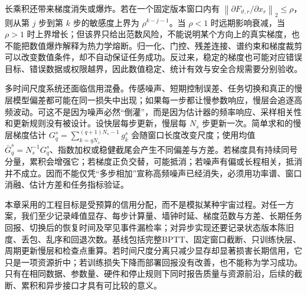 长乘积还带来梯度消失或爆炸。若在一个固定版本窗口内有 $\left\lVert \partial F_{\vartheta,r}/\partial x_r\right\rVert_2\leq\rho$，则从第 $j$ 步到第 $k$ 步的敏感度上界为 $\rho^{k-j-1}$。当 $\rho<1$ 时远期影响衰减，当 $\rho>1$ 时上界增长；但该界只给出范数风险，不能说明某个方向上的真实梯度，也不能把数值爆炸解释为热力学熔断。归一化、门控、残差连接、谱约束和梯度裁剪可以改变数值条件，却不自动保证任务成功。反过来，稳定的梯度也可能对应错误目标、错误数据或权限越界，因此数值稳定、统计有效与安全合规需要分别验收。

多时间尺度系统还面临信用混叠。传感噪声、短期控制误差、任务切换和真正的慢层模型偏差都可能在同一损失中出现；如果每一步都让慢参数响应，慢层会追逐高频波动。可这不是因为噪声必然“倒灌”，而是因为估计器的频率响应、采样相关性和更新规则没有被设计。设快层每步更新，慢层每 $N_s$ 步更新一次。简单求和的慢层梯度估计 $G_q^s=\sum_{k=qN_s}^{(q+1)N_s-1}g_k^s$ 会随窗口长度改变尺度；使用均值 $\bar G_q^s=N_s^{-1}G_q^s$、指数加权或稳健截尾会产生不同偏差与方差。若梯度具有持续同号分量，累积会增强它；若梯度正负交替，可能抵消；若噪声有偏或长程相关，抵消并不成立。因而不能仅凭“多步相加”宣称高频噪声已经消失，必须用功率谱、窗口消融、估计方差和任务指标验证。

本章采用的工程目标是受预算的信用分配，而不是模拟某种宇宙过程。对任一方案，我们至少记录峰值显存、每步计算量、墙钟时延、梯度范数与方差、长期任务回报、切换后的恢复时间及罕见事件漏检率；对异步实现还要记录状态版本陈旧度、丢包、乱序和回退次数。基线包括完整BPTT、固定窗口截断、只训练快层、周期更新慢层和检查点重算。若时间尺度分离只减少显存却显著损害长期信用，它只是一项资源折中；若训练损失下降而部署回报没有改善，也不能称为学习成功。只有在相同数据、参数量、硬件和停止规则下同时报告质量与资源前沿，后续的截断、累积和异步接口才具有可比较的意义。
